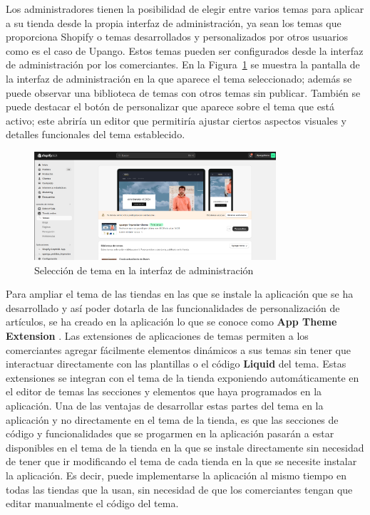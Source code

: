 \documentclass[12pt]{article}
\begin{document}
Los administradores tienen la posibilidad de elegir entre varios temas para aplicar a su tienda desde la propia interfaz de administración,
ya sean los temas que proporciona Shopify o temas desarrollados y personalizados por otros usuarios como es el caso de Upango. Estos temas pueden ser
configurados desde la interfaz de administración por los comerciantes.
En la Figura~\ref{fig:2} se muestra la pantalla de la interfaz de administración en la que aparece el tema seleccionado; además se puede observar una 
biblioteca de temas con otros temas sin publicar. También se puede destacar el botón de personalizar que aparece
sobre el tema que está activo; este abriría un editor que permitiría ajustar ciertos aspectos visuales y detalles funcionales del tema establecido.

\begin{figure}[ht]
    \centering
    \includegraphics[width=0.8\textwidth]{imagenes/Interfaz de adminsitración elección de tema.png}
    \caption{\label{fig:2}Selección de tema en la interfaz de administración}
    \vspace{\fill}
\end{figure}

Para ampliar el tema de las tiendas en las que se instale la aplicación que se ha desarrollado y así poder dotarla de las funcionalidades de personalización de 
artículos, se ha creado en la aplicación lo que se conoce como \textbf{App Theme Extension} \cite{theme-app-extension}. Las extensiones de aplicaciones de temas permiten a los comerciantes
agregar fácilmente elementos dinámicos a sus temas sin tener que interactuar directamente con las plantillas o el código \textbf{Liquid} del tema. Estas extensiones
se integran con el tema de la tienda exponiendo automáticamente en el editor de temas las secciones y elementos que haya programados en la aplicación. \cite{shopify-dev}
Una de las ventajas de desarrollar estas partes del tema en la aplicación y no directamente en el tema de la tienda, es que las secciones de código y funcionalidades
que se progarmen en la aplicación pasarán a estar disponibles en el tema de la tienda en la que se instale directamente sin necesidad de tener que ir modificando el tema
de cada tienda en la que se necesite instalar la aplicación. Es decir, puede implementarse la aplicación al mismo tiempo en todas las tiendas que la usan,
sin necesidad de que los comerciantes tengan que editar manualmente el código del tema.
\end{document}
